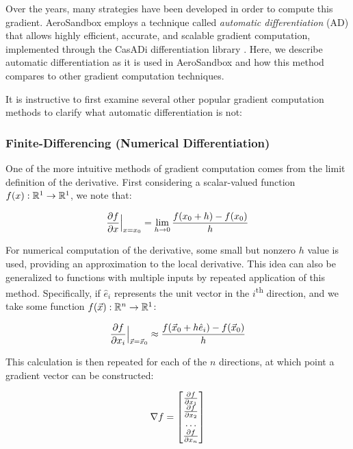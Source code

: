 Over the years, many strategies have been developed in order to compute this gradient. AeroSandbox employs a technique called \textit{automatic differentiation} (AD) that allows highly efficient, accurate, and scalable gradient computation, implemented through the CasADi differentiation library \cite{casadi}. Here, we describe automatic differentiation as it is used in AeroSandbox and how this method compares to other gradient computation techniques.

It is instructive to first examine several other popular gradient computation methods to clarify what automatic differentiation is not:

\subsubsection{Finite-Differencing (Numerical Differentiation)}

One of the more intuitive methods of gradient computation comes from the limit definition of the derivative. First considering a scalar-valued function $f(x): \mathbb{R}^1 \to \mathbb{R}^1$, we note that:

\begin{equation}
    \frac{\partial f}{\partial x}\Big|_{x=x_0} = \lim_{h\to 0} \frac{f(x_0 + h) - f(x_0)}{h}
\end{equation}

For numerical computation of the derivative, some small but nonzero $h$ value is used, providing an approximation to the local derivative. This idea can also be generalized to functions with multiple inputs by repeated application of this method. Specifically, if $\hat{e}_i$ represents the unit vector in the $i$\textsuperscript{th} direction, and we take some function $f(\vec{x}): \mathbb{R}^n \to \mathbb{R}^1$:

\begin{equation}
    \frac{\partial f}{\partial x_i}\Big|_{\vec{x}=\vec{x}_0} \approx \frac{f(\vec{x}_0 + h\hat{e}_i) - f(\vec{x}_0)}{h}
    \label{eq:fd}
\end{equation}

This calculation is then repeated for each of the $n$ directions, at which point a gradient vector can be constructed:

\begin{equation}
    \nabla f = \begin{bmatrix}
                   \frac{\partial f}{\partial x_1} \\
                   \frac{\partial f}{\partial x_2} \\
                   \dots \\
                   \frac{\partial f}{\partial x_n} \\
    \end{bmatrix}
\end{equation}

